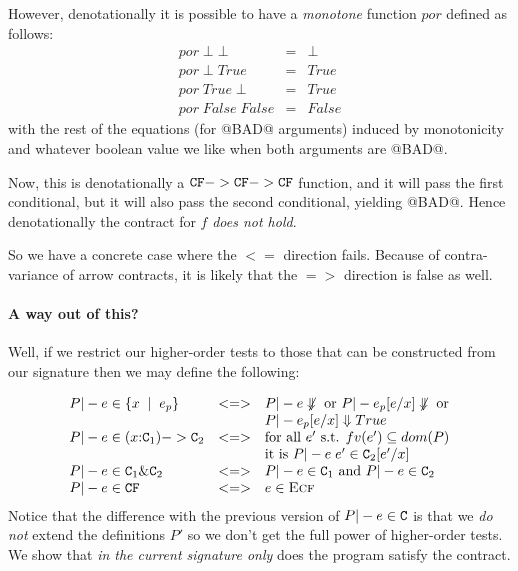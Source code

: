 \documentclass[preprint,nocopyrightspace,draft]{sigplanconf}
\begin{document}
However, denotationally it is possible to have a {\em monotone} function $por$ defined as follows:
\[\begin{array}{lcl}
  por\;\bot\;\bot & = & \bot \\ 
  por\;\bot\;True & = & True \\
  por\;True\;\bot & = & True \\ 
  por\;False\;False & = & False
\end{array}\] 
with the rest of the equations (for @BAD@ arguments) induced by monotonicity and whatever boolean value 
we like when both arguments are @BAD@. 

Now, this is denotationally a ${\tt CF} -> {\tt CF} -> {\tt CF}$ function, and it will pass the first conditional, but it will
also pass the second conditional, yielding @BAD@. Hence denotationally the contract for $f$ {\em does not hold}.

So we have a concrete case where the $<=$ direction fails. Because of contra-variance of arrow contracts, it is 
likely that the $=>$ direction is false as well. 




\paragraph{A way out of this?}
Well, if we restrict our higher-order tests to those that can be constructed from our signature then 
we may define the following:

{\setlength{\arraycolsep}{2pt}
\[\begin{array}{lcl}
    P |- e \in \{ x\;\mid\;e_p\} & <=> & P |- e \not\Downarrow \mbox{ or } P |- e_p[e/x] \not\Downarrow \mbox{ or} \\ 
                                 &     & P |- e_p[e/x] \Downarrow True \\
    P |- e \in (x{:}{\tt C}_1) -> {\tt C}_2 & <=> & 
                                 \mbox{for all } e' \mbox{ s.t. } fv(e') \subseteq dom(P)  \\ 
                                   &   &  \mbox{it is } P |- e\;e' \in {\tt C}_2[e'/x] \\
    P |- e \in {\tt C}_1 \& {\tt C}_2 & <=> & P |- e \in {\tt C}_1 \mbox{ and } P |- e \in {\tt C}_2 \\
    P |- e \in {\tt CF}            & <=> & e \in \textsc{Ecf} 
\end{array}\]}
Notice that the difference with the previous version of $P |- e \in {\tt C}$ is that we {\em do not} extend the 
definitions $P'$ so we don't get the full power of higher-order tests. We show that {\em in the current signature
only} does the program satisfy the contract. 
\end{document}
